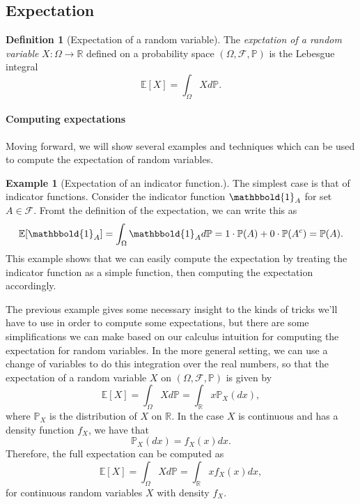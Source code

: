 \documentclass[12pt]{article}
\newcommand{\bbR}{\mathbb{R}}
\newcommand{\calF}{\mathcal{F}}
\newcommand{\Prob}{\mathbb{P}}
\newcommand{\Expect}{\mathbb{E}}
\newcommand{\ind}{\mathbbold{1}}
\theoremstyle{definition}
\newtheorem{defn}[thm]{Definition}
\newtheorem{exmp}[thm]{Example}
\theoremstyle{remark}
\numberwithin{equation}{section}
\begin{document}
\subsection{Expectation}%
\label{sub:expectation}



\begin{defn}[Expectation of a random variable]
  The \emph{expctation of a random variable } $X\colon \Omega \to \bbR$ defined on a probability space $(\Omega, \calF, \Prob)$ is the Lebesgue integral
  \begin{equation}
    \Expect[X] = \int_\Omega X d\Prob.
  \end{equation}
\end{defn}

\paragraph{Computing expectations} Moving forward, we will show several examples and techniques which can be used to compute the expectation of random variables. 

\begin{exmp}[Expectation of an indicator function.]
The simplest case is that of indicator functions. Consider the indicator function $\ind_A$ for set $A\in\calF$. Fromt the definition of the expectation, we can write this as
\begin{equation}
  \Expect[ \ind_A ] = \int_\Omega \ind_A d\Prob = 1 \cdot \Prob(A) + 0 \cdot \Prob(A^c) = \Prob(A).
\end{equation}
This example shows that we can easily compute the expectation by treating the indicator function as a simple function, then computing the expectation accordingly.
\end{exmp}

The previous example gives some necessary insight to the kinds of tricks we'll have to use in order to compute some expectations, but there are some simplifications we can make based on our calculus intuition for computing the expectation for random variables. In the more general setting, we can use a change of variables to do this integration over the real numbers, so that the expectation of a random variable $X$ on $(\Omega, \calF, \Prob)$ is given by
\begin{equation}
  \Expect[X] = \int_\Omega X d\Prob = \int_\bbR x \Prob_X(dx),
\end{equation}
where $\Prob_X$ is the distribution of $X$ on $\bbR$. In the case $X$ is continuous and has a density function $f_X$, we have that 
\begin{equation}
  \Prob_X(dx) = f_X(x)dx.
\end{equation}
Therefore, the full expectation can be computed as 
\begin{equation}
  \Expect[X] = \int_\Omega X d\Prob = \int_\bbR x f_X(x) dx,
\end{equation}
for continuous random variables $X$ with density $f_X$.
\end{document}
